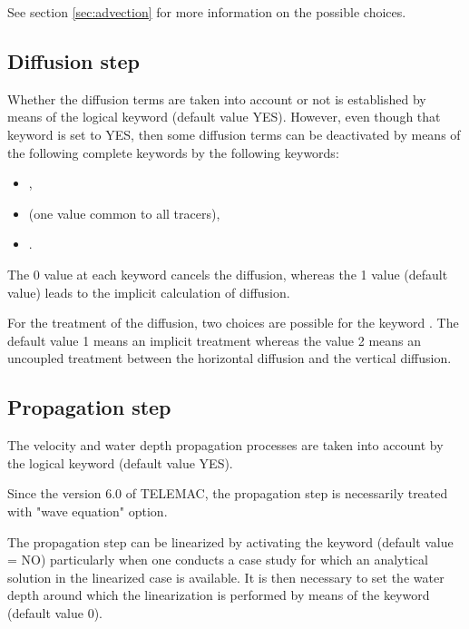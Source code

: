 See section \ref{sec:advection} for more information on the possible choices.

\subsection{Diffusion step}
\label{sec:difstep}

Whether the diffusion terms are taken into account or not is established by
means of the logical keyword  (default value YES).
However, even though that keyword is set to YES, then some diffusion terms can
be deactivated by means of the following complete keywords by the following
keywords:

\begin{itemize}
\item {},

\item {} (one value common to all tracers),

\item {}.
\end{itemize}

The 0 value at each keyword cancels the diffusion, whereas the 1 value
(default value) leads to the implicit calculation of diffusion.

For the treatment of the diffusion, two choices are possible for the keyword
. The default value 1 means an implicit
treatment whereas the value 2 means an uncoupled treatment between the
horizontal diffusion and the vertical diffusion.


\subsection{Propagation step}

The velocity and water depth propagation processes are taken into account by
the logical keyword  (default value YES).

Since the version 6.0 of TELEMAC, the propagation step is necessarily treated
with  "wave equation" option.

The propagation step can be linearized by activating the keyword
 (default value = NO) particularly when one
conducts a case study for which an analytical solution in the linearized case
is available. It is then necessary to set the water depth around which the
linearization is performed by means of the keyword  (default value 0).

